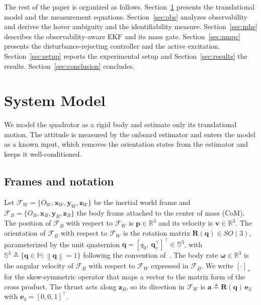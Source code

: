 \documentclass{ieeeaccess}
\newcommand{\R}{\mathbb{R}}
\newcommand{\SOg}{SO(3)}
\newcommand{\norm}[1]{\left\| #1 \right\|}
\newcommand{\vect}[1]{\bm{#1}}
\newcommand{\mat}[1]{\mathbf{#1}}
\begin{document}
The rest of the paper is organized as follows. Section~\ref{sec:model}
presents the translational model and the measurement equations.
Section~\ref{sec:obs} analyzes observability and derives the hover ambiguity and
the identifiability measure. Section~\ref{sec:mhe} describes the
observability-aware EKF and its mass gate. Section~\ref{sec:nmpc} presents the
disturbance-rejecting controller and the active excitation.
Section~\ref{sec:setup} reports the experimental setup and
Section~\ref{sec:results} the results. Section~\ref{sec:conclusion} concludes.

\section{System Model}\label{sec:model}

We model the quadrotor as a rigid body and estimate only its translational
motion. The attitude is measured by the onboard estimator and enters the model
as a known input, which removes the orientation states from the estimator and
keeps it well-conditioned.

\subsection{Frames and notation}
Let $\mathcal{F}_W=\{O_W,\vect{x}_W,\vect{y}_W,\vect{z}_W\}$ be the inertial
world frame and $\mathcal{F}_B=\{O_B,\vect{x}_B,\vect{y}_B,\vect{z}_B\}$ the body
frame attached to the center of mass (CoM). The position of $\mathcal{F}_B$ with
respect to $\mathcal{F}_W$ is $\vect{p}\in\R^3$ and its velocity is
$\vect{v}\in\R^3$. The orientation of $\mathcal{F}_B$ with respect to
$\mathcal{F}_W$ is the rotation matrix $\mat{R}(\vect{q})\in\SOg$, parameterized
by the unit quaternion
$\vect{q}=[q_0,\ \vect{q}_v^{\!\top}]^{\!\top}\in\mathbb{S}^3$, with
$\mathbb{S}^3\triangleq\{\vect{q}\in\mathbb{H}:\norm{\vect{q}}=1\}$ following the
convention of~\cite{shuster1993survey}. The body rate $\vect{\omega}\in\R^3$ is
the angular velocity of $\mathcal{F}_B$ with respect to $\mathcal{F}_W$ expressed
in $\mathcal{F}_B$. We write $[\cdot]_\times$ for the skew-symmetric operator
that maps a vector to the matrix form of the cross product. The thrust acts
along $\vect{z}_B$, so its direction in $\mathcal{F}_W$ is
$\vect{a}\triangleq\mat{R}(\vect{q})\,\vect{e}_3$ with
$\vect{e}_3=[0,0,1]^{\!\top}$.
\end{document}

